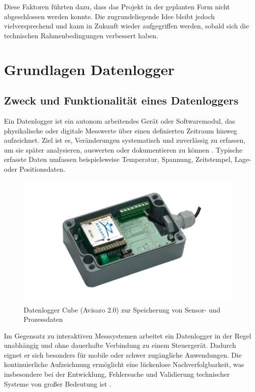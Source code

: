 \documentclass[a4paper, 12pt]{article} %
\begin{document}
Diese Faktoren führten dazu, dass das Projekt in der geplanten Form nicht abgeschlossen werden konnte. 
Die zugrundeliegende Idee bleibt jedoch vielversprechend und kann in Zukunft wieder aufgegriffen werden, sobald sich 
die technischen Rahmenbedingungen verbessert haben.

\clearpage

\section{Grundlagen Datenlogger}
\subsection{Zweck und Funktionalität eines Datenloggers}
Ein Datenlogger ist ein autonom arbeitendes Gerät oder Softwaremodul, das physikalische oder digitale Messwerte über einen definierten Zeitraum hinweg aufzeichnet. Ziel ist es, Veränderungen systematisch und zuverlässig zu erfassen, um sie später analysieren, auswerten oder dokumentieren zu können \cite{poole2020data, smith2018sensors}. Typische erfasste Daten umfassen beispielsweise Temperatur, Spannung, Zeitstempel, Lage- oder Positionsdaten.

\begin{figure}[H]
    \centering
    \includegraphics[width=1\linewidth]{images/Datalogger}
    \caption{Datenlogger Cube (Avisaro 2.0) zur Speicherung von Sensor- und Prozessdaten}
    \label{fig:datenlogger_cube}
\end{figure}

Im Gegensatz zu interaktiven Messsystemen arbeitet ein Datenlogger in der Regel unabhängig und ohne dauerhafte Verbindung zu einem Steuergerät. Dadurch eignet er sich besonders für mobile oder schwer zugängliche Anwendungen. Die kontinuierliche Aufzeichnung ermöglicht eine lückenlose Nachverfolgbarkeit, was insbesondere bei der Entwicklung, Fehlersuche und Validierung technischer Systeme von großer Bedeutung ist \cite{dewesoft2024guide}.
\end{document}
